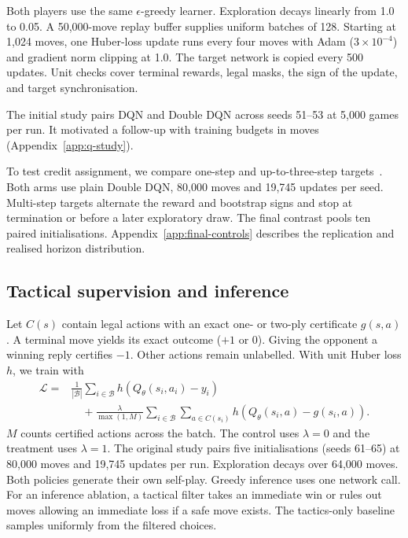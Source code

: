 \documentclass[letterpaper]{article}
\begin{document}
Both players use the same $\epsilon$-greedy learner. Exploration decays linearly
from 1.0 to 0.05. A 50,000-move replay buffer supplies uniform batches of 128.
Starting at 1,024 moves, one Huber-loss update runs every four moves with Adam
($3\times10^{-4}$) and gradient norm clipping at 1.0. The target network is
copied every 500 updates. Unit checks cover terminal rewards, legal masks,
the sign of the update, and target synchronisation.

The initial study pairs DQN and Double DQN across seeds 51--53 at 5,000
games per run. It motivated a follow-up with training budgets in moves
(Appendix~\ref{app:q-study}).

To test credit assignment, we compare one-step and up-to-three-step targets~\cite{hessel2018}.
Both arms use plain Double DQN, 80,000 moves and 19,745 updates per seed.
Multi-step targets alternate the reward and bootstrap signs and stop at
termination or before a later exploratory draw. The final contrast pools
ten paired initialisations. Appendix~\ref{app:final-controls} describes the
replication and realised horizon distribution.

\subsection{Tactical supervision and inference}
Let $C(s)$ contain legal actions with an exact one- or two-ply certificate
$g(s,a)$. A terminal move yields its exact outcome ($+1$ or $0$).
Giving the opponent a winning reply certifies $-1$. Other actions remain
unlabelled. With unit Huber loss $h$, we train with
\begin{equation}
 \begin{aligned}
 \mathcal L={}&\frac{1}{|\mathcal B|}\sum_{i\in\mathcal B}h(Q_\theta(s_i,a_i)-y_i)\\
 &\quad+\frac{\lambda}{\max(1,M)}\sum_{i\in\mathcal B}\sum_{a\in C(s_i)}
     h(Q_\theta(s_i,a)-g(s_i,a)).
 \end{aligned}
 \label{eq:tactical-loss}
\end{equation}
$M$ counts certified actions across the batch. The control uses $\lambda=0$ and the treatment uses $\lambda=1$. The original study pairs
five initialisations (seeds 61--65) at 80,000 moves and 19,745 updates per
run. Exploration decays over 64,000 moves. Both policies generate their
own self-play. Greedy inference uses one network call. For an inference
ablation, a tactical filter takes an immediate win or rules out moves
allowing an immediate loss if a safe move exists. The tactics-only baseline
samples uniformly from the filtered choices.
\end{document}
